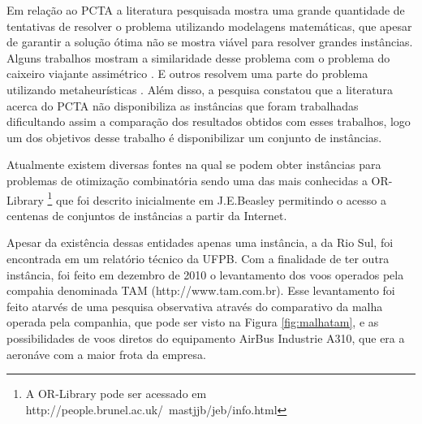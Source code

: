 
Em relação ao PCTA a literatura pesquisada \cite{ahmed2009} \cite{arguelo1007}
\cite{cordeau2001} \cite{mohamed2011} \cite{abiliolivro} mostra uma grande quantidade de
tentativas de resolver o problema utilizando modelagens matemáticas, que apesar
de garantir a solução ótima não se mostra viável para resolver grandes
instâncias. Alguns trabalhos mostram a similaridade desse problema com o
problema do caixeiro viajante assimétrico \cite{clarke97}. E outros resolvem
uma parte do problema utilizando metaheurísticas \cite{arguelo1007}. Além disso,
a pesquisa constatou que a literatura acerca do PCTA não disponibiliza as
instâncias que foram trabalhadas dificultando assim a comparação dos
resultados obtidos com esses trabalhos, logo um dos objetivos desse trabalho é
disponibilizar um conjunto de instâncias.


Atualmente existem diversas fontes na qual se podem obter instâncias para
problemas de otimização combinatória sendo uma das mais conhecidas a
OR-Library \footnote{ A OR-Library pode ser acessado em
http://people.brunel.ac.uk/~mastjjb/jeb/info.html} que foi descrito
inicialmente em J.E.Beasley \cite{orlibrary} permitindo o acesso a centenas de
conjuntos de instâncias a partir da Internet.
  
Apesar da existência dessas entidades apenas uma instância, a da Rio Sul, foi
encontrada em um relatório técnico da UFPB. Com a finalidade de ter outra
instância, foi feito em dezembro de 2010 o levantamento dos voos operados pela
compahia denominada TAM (http://www.tam.com.br). Esse levantamento foi feito
atarvés de uma pesquisa observativa através do comparativo da malha operada
pela companhia, que pode ser visto na Figura \ref{fig:malhatam}, e as
possibilidades de voos diretos do equipamento AirBus Industrie A310, que era a aeronáve com a maior frota da
empresa.
	

